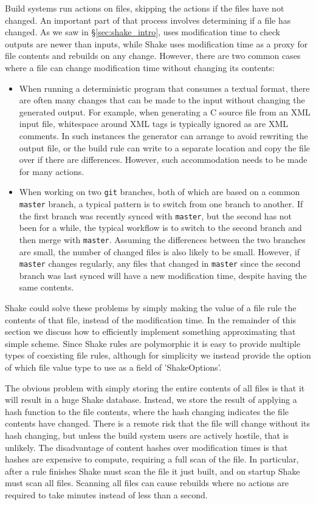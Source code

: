 Build systems run actions on files, skipping the actions if the files have not changed. An important part of that process involves determining if a file has changed. As we saw in \S\ref{sec:shake_intro}, \make{} uses modification time to check outputs are newer than inputs, while Shake uses modification time as a proxy for file contents and rebuilds on any change. However, there are two common cases where a file can change modification time without changing its contents:

\begin{itemize}
\item When running a deterministic program that consumes a textual format, there are often many changes that can be made to the input without changing the generated output. For example, when generating a C source file from an XML input file, whitespace around XML tags is typically ignored as are XML comments. In such instances the generator can arrange to avoid rewriting the output file, or the build rule can write to a separate location and copy the file over if there are differences. However, such accommodation needs to be made for many actions.
\item When working on two \texttt{git} branches, both of which are based on a common \texttt{master} branch, a typical pattern is to switch from one branch to another. If the first branch was recently synced with \texttt{master}, but the second has not been for a while, the typical workflow is to switch to the second branch and then merge with \texttt{master}. Assuming the differences between the two branches are small, the number of changed files is also likely to be small. However, if \texttt{master} changes regularly, any files that changed in \texttt{master} since the second branch was last synced will have a new modification time, despite having the same contents.
\end{itemize}

Shake could solve these problems by simply making the value of a file rule the contents of that file, instead of the modification time. In the remainder of this section we discuss how to efficiently implement something approximating that simple scheme. Since Shake rules are polymorphic it is easy to provide multiple types of coexisting file rules, although for simplicity we instead provide the option of which file value type to use as a field of \lst'ShakeOptions'.

The obvious problem with simply storing the entire contents of all files is that it will result in a huge Shake database. Instead, we store the result of applying a hash function to the file contents, where the hash changing indicates the file contents have changed. There is a remote risk that the file will change without its hash changing, but unless the build system users are actively hostile, that is unlikely. The disadvantage of content hashes over modification times is that hashes are expensive to compute, requiring a full scan of the file. In particular, after a rule finishes Shake must scan the file it just built, and on startup Shake must scan all files. Scanning all files can cause rebuilds where no actions are required to take minutes instead of less than a second.

